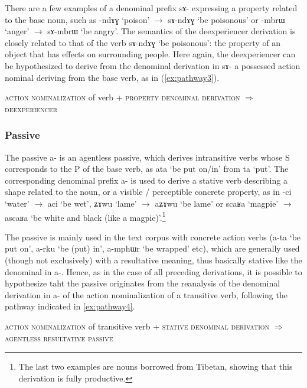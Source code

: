 \documentclass[oldfontcommands,oneside,a4paper,11pt]{article}
\newcommand{\ipa}[1]{\mbox{\phon #1}} %
\begin{document}
There are a few examples of a denominal prefix \ipa{sɤ-} expressing a property related to the base noun, such as \ipa{-ndɤɣ} `poison' $\rightarrow$ \ipa{sɤ-ndɤɣ} `be poisonous' or \ipa{-mbrɯ} `anger'  $\rightarrow$ \ipa{sɤ-mbrɯ} `be angry'. The semantics of the deexperiencer derivation is closely related to that of the verb  \ipa{sɤ-ndɤɣ} `be poisonous': the property of an object that has effects on surrounding people. Here again, the deexperiencer can be hypothesized to derive from the denominal derivation in \ipa{sɤ-} a possessed action nominal deriving from the base verb, as in (\ref{ex:pathway3}).

\begin{exe}
\ex \label{ex:pathway3}
\glt \textsc{action nominalization} of verb + \textsc{property denominal derivation} $\Rightarrow$ \textsc{deexperiencer}
\end{exe}
\subsubsection{Passive} \label{sec:passive}
The passive \ipa{a-} is an agentless passive, which derives intransitive verbs whose S corresponds to the P of the base verb, as \ipa{ata}  `be put on/in' from \ipa{ta} `put'. The corresponding denominal prefix \ipa{a-} is used to derive a stative verb describing a shape related to the noun, or a visible / perceptible concrete property, as in \ipa{-ci} `water' $\rightarrow$  \ipa{aci} `be wet',  \ipa{ʑɤwu} `lame' $\rightarrow$  \ipa{aʑɤwu} `be lame' 
or \ipa{scaʁa} `magpie' $\rightarrow$  \ipa{ascaʁa} `be white and black (like a magpie)'.\footnote{The last two examples are nouns borrowed from Tibetan, showing that this derivation is fully productive.} 

The passive is mainly used in the text corpus with concrete action verbs (\ipa{a-ta} `be put on', \ipa{a-rku} `be (put) in', \ipa{a-mphɯr} `be wrapped' etc),  which are generally used (though not exclusively) with a resultative meaning, thus basically stative like the denominal in \ipa{a-}. Hence, as in the case of all preceding derivations, it is possible to hypothesize taht the passive originates from the reanalysis of the denominal derivation in \ipa{a-} of  the action nominalization of a transitive verb, following the pathway indicated in \ref{ex:pathway4}.


\begin{exe}
\ex \label{ex:pathway4}
\glt \textsc{action nominalization} of transitive verb + \textsc{stative denominal derivation} $\Rightarrow$ \textsc{agentless resultative passive}
\end{exe}
\end{document}
